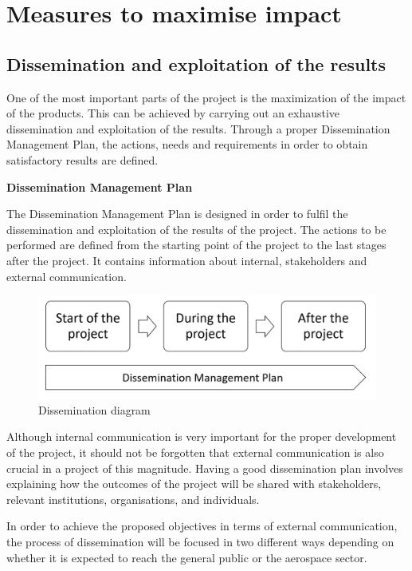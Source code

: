\section{Measures to maximise impact}

\subsection{Dissemination and exploitation of the results}

One of the most important parts of the project is the maximization of the impact of the products. This can be achieved by carrying out an exhaustive dissemination and exploitation of the results. Through a proper Dissemination Management Plan, the actions, needs and requirements in order to obtain satisfactory results are defined. 

\textbf{Dissemination Management Plan}

The Dissemination Management Plan is designed in order to fulfil the dissemination and exploitation of the results of the project. The actions to be performed are defined from the starting point of the project to the last stages after the project. It contains information about internal, stakeholders and external communication.

\begin{figure}[H]
	\centering
	\includegraphics[width=\textwidth]{images/dissemination.png}
	\caption{Dissemination diagram} 
	\label{dissemination}
\end{figure}

Although internal communication is very important for the proper development of the project, it should not be forgotten that external communication is also crucial in a project of this magnitude. Having a good dissemination plan involves explaining how the outcomes of the project will be shared with stakeholders, relevant institutions, organisations, and individuals.

In order to achieve the proposed objectives in terms of external communication, the process of dissemination will be focused in two different ways depending on whether it is expected to reach the general public or the aerospace sector.

